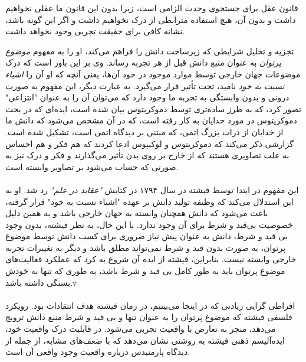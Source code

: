 \documentclass[10pt,a4paper]{article}
\begin{document}
                    \begin{qt}
                        قانون عقل برای جستجوی وحدت الزامی است، زیرا بدون این قانون ما عقلی نخواهیم داشت و بدون آن، هیچ استفاده مترابطی از درک نخواهیم داشت و اگر این گونه باشد، نشانه کافی برای حقیقت تجربی وجود نخواهد داشت.
                    \end{qt}
                    تجزیه و تحلیل شرایطی که زیرساخت دانش را فراهم می‌کند، او را به مفهوم \textit{موضوع پرتوان} به عنوان منبع دانش قبل از هر تجربه رساند. وی بر این باور است که درک موضوعات جهان خارجی توسط موارد موجود در خود آن‌ها، یعنی آنچه که او آن را \textit{اشیاء نسبت به خود} نامید، تحت تأثیر قرار می‌گیرد. به عبارت دیگر، این مفهوم به صورت درونی و بدون وابستگی به تجربه ما وجود دارد که می‌توان آن را به عنوان "انتزاعی" تصور کرد، که به طرز ساده‌تری توسط دموکریتوس بیان شده است، ایده‌ای که در بحث دموکریتوس در مورد خدایان به کار رفته است، که در آن مشخص می‌شود که دانش ما از خدایان از ذرات بزرگ اتمی، که مبتنی بر دیدگاه اتمی است، تشکیل شده است. گزارشی ذکر می‌کند که دموکریتوس و لوکیپوس ادعا کردند که هم فکر و هم احساس به علت تصاویری هستند که از خارج بر روی بدن تأثیر می‌گذارند و فکر و درک نیز به صورتی که حساب می‌شود بر تصاویر وابسته است.\cite{Cartledge1998-CARDTG-3}\cite{sep-democritus}\cite{Graham2010-th}
                    \\
                    \\
این مفهوم در ابتدا توسط فیشته در سال ۱۷۹۴ در کتابش \textit{"عقاید در علم"} رد شد. او به این استدلال می‌کند که وظیفه تولید دانش بر عهده "اشیاء نسبت به خود" قرار گرفته، باعث می‌شود که دانش همچنان وابسته به جهان خارجی باشد و به همین دلیل خصوصیت بی‌قید و شرط برای آن وجود ندارد. با این حال، به نظر فیشته، بدون وجود بی قید و شرط، دانش به عنوان پیش نیاز ضروری برای کسب دانش توسط موضوع پرتوان، به صورت بدون قید و شرط نمی‌تواند مطلق باشد و دیگر به تغییرات تجربه خارجی وابسته نیست. بنابراین، فیشته از ایده آن شروع به کرد که عملکرد فعالیت‌های موضوع پرتوان باید به طور کامل بی قید و شرط باشد، به طوری که تنها به خودش بستگی داشته باشد.v
                    \\
                    \\
                   افراطی گرایی زیادتی که در اینجا می‌بینیم، در زمان فیشته هدف انتقادات بود. رویکرد فلسفی فیشته که موضوع پرتوان را به عنوان تنها و بی قید و شرط منبع دانش ترویج می‌دهد، منجر به تعارض با واقعیت تجربی می‌شود. در قابلیت درک واقعیت خود، ایده‌آلیسم ذهنی فیشته به روشنی نشان می‌دهد که با ضعف‌های مشابه، از جمله از دیدگاه پارمنیدس درباره واقعیت وجود واقعی آن است.
                    \\
                    \\
\end{document}
